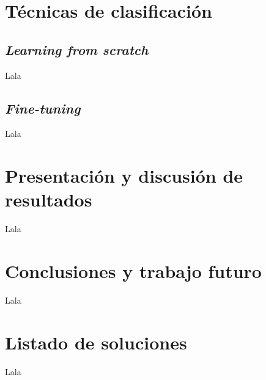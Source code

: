 \section{Técnicas de clasificación}

\subsection{\textit{Learning from scratch}}

Lala

\subsection{\textit{Fine-tuning}}

Lala

\section{Presentación y discusión de resultados}

Lala

\section{Conclusiones y trabajo futuro}

Lala

\section{Listado de soluciones}

Lala


\newpage


